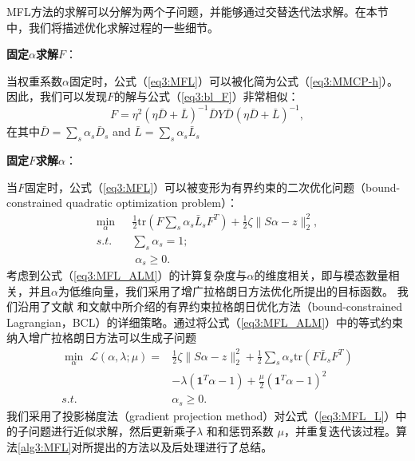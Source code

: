 MFL方法的求解可以分解为两个子问题，并能够通过交替迭代法求解。在本节中，我们将描述优化求解过程的一些细节。

    \textbf{固定$\alpha$求解$F$}：

当权重系数$\alpha$固定时，公式（\ref{eq3:MFL}）可以被化简为公式（\ref{eq3:MMCP-h}）。因此，我们可以发现$F$的解与公式（\ref{eq3:bl_F}）非常相似：
\begin{equation}
{F} = \eta^2(\eta\bar{{D}}+\bar{{L}})^{-1}\bar{{D}} {Y}\bar{{D}}(\eta\bar{{D}}+\bar{{L}})^{-1},
\label{eq3:MFL_F}
\end{equation}
在其中$  \bar{{D}} = \sum_s \alpha_s  \bar{{D}}_s $ and $  \bar{{L}} = \sum_s \alpha_s \bar{{L}}_s $

    \textbf{固定$F$求解$\alpha$}：

当$F$固定时，公式（\ref{eq3:MFL}）可以被变形为有界约束的二次优化问题（bound-constrained quadratic optimization problem）：
\begin{equation}
\begin{split}
\mathop{\mathrm{min}}_{{\alpha}}\;&\frac{1}{2}\mathrm{tr}({F} \sum_s\alpha_s\bar{{L}}_s{F}^T)+\frac{1}{2}\zeta\|{S}{\alpha} - {z}  \|_2^2,\\
s.t.\quad& \sum_s \alpha_s = 1;\\ &\; \alpha_s \ge 0.
\end{split}
\label{eq3:MFL_ALM}
\end{equation}    
考虑到公式（\ref{eq3:MFL_ALM}）的计算复杂度与$\alpha$的维度相关，即与模态数量相关，并且$\alpha$为低维向量，我们采用了增广拉格朗日方法\cite{bertsekas1982constrained}优化所提出的目标函数。
我们沿用了文献\parencite{nocedal2006numerical} 和文献\parencite{bertsekas1982constrained}中所介绍的有界约束拉格朗日优化方法（bound-constrained Lagrangian，BCL）的详细策略。通过将公式（\ref{eq3:MFL_ALM}）中的等式约束纳入增广拉格朗日方法可以生成子问题
\begin{equation}
\begin{split}
\mathop{\mathrm{min}}_{{\alpha}}\;\mathcal{L}({\alpha},\lambda;\mu) =&\frac{1}{2}\zeta\|{S}{\alpha} - {z}\|_2^2+\frac{1}{2}\sum_s\alpha_s\mathrm{tr}({F} \bar{{L}}_s{F}^T) \\
&- \lambda(\mathbf{1}^T{\alpha}-1)+\frac{\mu}{2}(\mathbf{1}^T{\alpha}-1)^2\\
s.t.\quad &\alpha_s \ge 0.
\end{split}
\label{eq3:MFL_L}
\end{equation}
我们采用了投影梯度法（gradient projection method）对公式（\ref{eq3:MFL_L}）中的子问题进行近似求解，然后更新乘子$ \lambda $ 和和惩罚系数 $ \mu $，并重复迭代该过程\cite{nocedal2006numerical,conn1992lancelot}。算法\ref{alg3:MFL}对所提出的方法以及后处理进行了总结。

